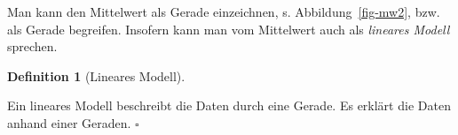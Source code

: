 \documentclass[
  letterpaper,
  twoside,
  open=any]{scrbook}
\theoremstyle{definition}
\newtheorem{definition}{Definition}[chapter]
\theoremstyle{definition}
\theoremstyle{definition}
\theoremstyle{remark}
\begin{document}
Man kann den Mittelwert als Gerade einzeichnen, s.
Abbildung~\ref{fig-mw2}, bzw. als Gerade begreifen. Insofern kann man
vom Mittelwert auch als \emph{lineares Modell} sprechen.

\begin{definition}[Lineares
Modell]\protect\hypertarget{def-lm}{}\label{def-lm}

Ein lineares Modell beschreibt die Daten durch eine Gerade. Es erklärt
die Daten anhand einer Geraden. \(\square\)

\end{definition}

\begin{figure}

\begin{minipage}{0.50\linewidth}



\end{minipage}%
%
\begin{minipage}{0.50\linewidth}

\end{minipage}
\end{figure}
\end{document}

